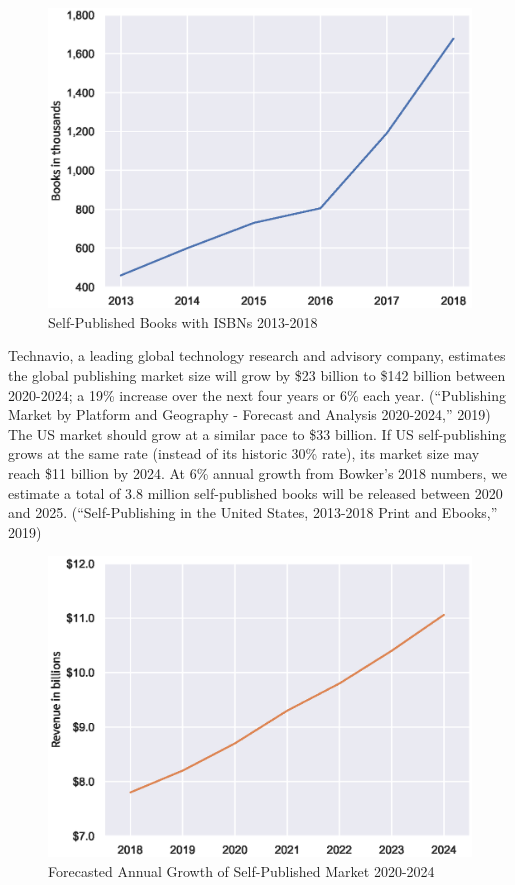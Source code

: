 \documentclass[11pt,openany]{book}
\begin{document}
\begin{figure}
\centering
\includegraphics{media/book-sales.eps}
\caption{Self-Published Books with ISBNs 2013-2018}
\end{figure}

Technavio, a leading global technology research and advisory company,
estimates the global publishing market size will grow by \$23 billion to
\$142 billion between 2020-2024; a 19\% increase over the next four
years or 6\% each year. (``Publishing Market by Platform and Geography -
Forecast and Analysis 2020-2024,'' 2019) The US market should grow at a
similar pace to \$33 billion. If US self-publishing grows at the same
rate (instead of its historic 30\% rate), its market size may reach \$11
billion by 2024. At 6\% annual growth from Bowker's 2018 numbers, we
estimate a total of 3.8 million self-published books will be released
between 2020 and 2025. (``Self-Publishing in the United States,
2013-2018 Print and Ebooks,'' 2019)

\begin{figure}
\centering
\includegraphics{media/market-growth.eps}
\caption{Forecasted Annual Growth of Self-Published Market 2020-2024}
\end{figure}
\end{document}

